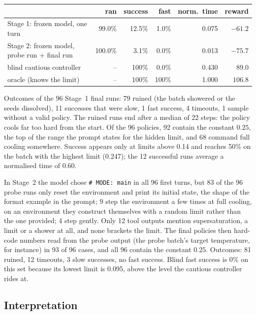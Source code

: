 \documentclass[11pt,a4paper]{article}
\begin{document}
\begin{center}\small
\begin{tabular}{lrrrrr}
\toprule
 & ran & success & fast & norm.\ time & reward \\
\midrule
Stage 1: frozen model, one turn            & 99.0\%  & 12.5\% & 1.0\% & 0.075 & $-61.2$ \\
Stage 2: frozen model, probe run + final run & 100.0\% & 3.1\%  & 0.0\% & 0.013 & $-75.7$ \\
blind cautious controller                   & --      & 100\%  & 0.0\% & 0.430 & $89.0$ \\
oracle (knows the limit)                    & --      & 100\%  & 100\% & 1.000 & $106.8$ \\
\bottomrule
\end{tabular}
\end{center}

Outcomes of the 96 Stage~1 final runs: 79 ruined (the batch showered or the
seeds dissolved), 11 successes that were slow, 1 fast success, 4 timeouts, 1
sample without a valid policy. The ruined runs end after a median of 22 steps:
the policy cools far too hard from the start. Of the 96 policies, 92 contain
the constant $0.25$, the top of the range the prompt states for the hidden
limit, and 68 command full cooling somewhere. Success appears only at limits
above 0.14 and reaches 50\% on the batch with the highest limit (0.247); the
12 successful runs average a normalised time of 0.60.

In Stage~2 the model chose \texttt{\# MODE: main} in all 96 first turns, but
83 of the 96 probe runs only reset the environment and print its initial
state, the shape of the format example in the prompt; 9 step the environment
a few times at full cooling, on an environment they construct themselves with
a random limit rather than the one provided; 4 step gently. Only 12 tool
outputs mention supersaturation, a limit or a shower at all, and none brackets
the limit. The final policies then hard-code numbers read from the probe
output (the probe batch's target temperature, for instance) in 93 of 96
cases, and all 96 contain the constant $0.25$. Outcomes: 81 ruined, 12
timeouts, 3 slow successes, no fast success. Blind fast success is 0\% on
this set because its lowest limit is 0.095, above the level the cautious
controller rides at.

\subsection*{Interpretation}
\end{document}
